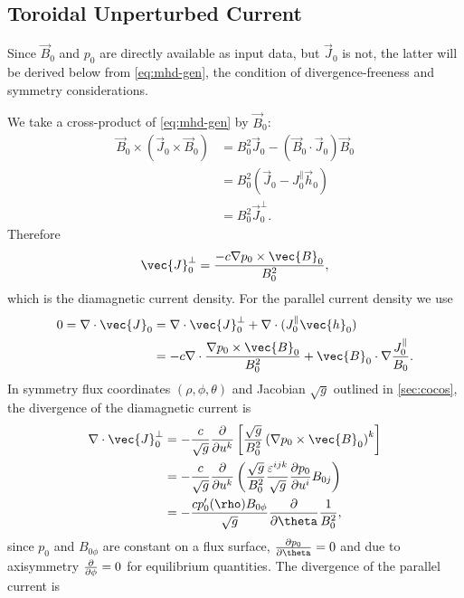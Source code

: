 \subsection{Toroidal Unperturbed Current}
\label{sec:j0phi}

Since $\vec{B}_{0}$ and $p_{0}$ are directly available as input data, but $\vec{J}_{0}$ is not, the latter will be derived below from \cref{eq:mhd-gen}, the condition of divergence-freeness and symmetry considerations.

We take a cross-product of \cref{eq:mhd-gen} by $\vec{B}_{0}$:
\begin{align}
  \vec{B}_{0} \times \left( \vec{J}_{0} \times \vec{B}_{0} \right) &= B_{0}^{2} \vec{J}_{0} - (\vec{B}_{0} \cdot \vec{J}_{0}) \vec{B}_{0} \nonumber \\
  &= B_{0}^{2} (\vec{J}_{0} - J_{0}^{\parallel} \vec{h}_{0}) \nonumber \\
  &= B_{0}^{2} \vec{J}_{0}^{\perp}.
\end{align}
Therefore
\begin{gather}
  \vec{J}_{0}^{\perp} = \frac{-c \grad p_{0} \times \vec{B}_{0}}{B_{0}^{2}},
\end{gather}
which is the diamagnetic current density. For the parallel current density we use
\begin{align}
 0 = \divg \vec{J}_{0} &= \divg \vec{J}_{0}^{\perp} + \divg (J_{0}^{\parallel} \vec{h}_{0}) \nonumber \\
 &= -c \divg \frac{\grad p_{0} \times \vec{B}_{0}}{B_{0}^{2}} + \vec{B}_{0} \cdot \grad \frac{J_{0}^{\parallel}}{B_{0}}.
\end{align}
In symmetry flux coordinates $(\rho, \phi, \theta)$ and Jacobian $\sqrt{g}$ outlined in \cref{sec:cocos}, the divergence of the diamagnetic current is
\begin{align}
  \divg \vec{J}_{0}^{\perp} &= -\frac{c}{\sqrt{g}} \pd{u^{k}} \left[ \frac{\sqrt{g}}{B_{0}^{2}} \left( \grad p_{0} \times \vec{B}_{0} \right)^{k} \right] \nonumber \\
  &= -\frac{c}{\sqrt{g}} \pd{u^{k}} \left( \frac{\sqrt{g}}{B_{0}^{2}} \frac{\varepsilon^{ijk}}{\sqrt{g}} \pd[p_{0}]{u^{i}} B_{0 j} \right) \nonumber \\
  &= -\frac{c p_{0}' (\rho) B_{0 \phi}}{\sqrt{g}} \pd{\theta} \frac{1}{B_{0}^{2}},
\end{align}
since $p_{0}$ and $B_{0 \phi}$ are constant on a flux surface, $\pd[p_{0}]{\theta} = 0$ and due to axisymmetry $\pd{\phi} = 0$ for equilibrium quantities. The divergence of the parallel current is
